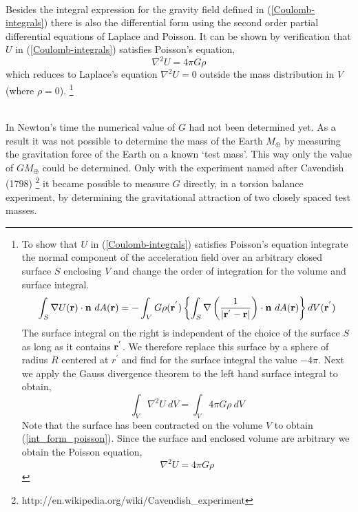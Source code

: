 ~\\
\noindent
Besides the integral expression for the gravity field defined in
(\ref{Coulomb-integrals}) there is also the differential form
using the second order partial differential equations of Laplace and
Poisson.
It can be shown by verification that $U$ in (\ref{Coulomb-integrals})
satisfies Poisson's equation, 
\begin{equation}
\boxed{\nabla^2 U = 4\pi G\rho}  \label{poisson_eqn}
\end{equation}
which reduces to Laplace's equation $\nabla^2 U = 0$
outside the mass distribution in $V$ (where $\rho =0$). 
\footnote{
To show that $U$ in (\ref{Coulomb-integrals}) satisfies Poisson's
equation integrate the normal component of the acceleration field
over an arbitrary closed surface $S$ enclosing $V$
and change the order of integration for the volume and surface
integral.
\begin{equation}
\int_S \nabla U({\bf r}) \cdot {\bf n} \ dA({\bf r})
   = - \int_V G \rho({\bf r}^{'}) 
    \left \{
     \int_S 
       \nabla 
       \left ( \frac{1}{\left | {\bf r}^{'}-{\bf r} \right |} \right )
      \cdot {\bf n} \ dA({\bf r}) 
    \right \} dV({\bf r}^{'})
\label{surface_integral}
\end{equation}
The surface integral on the right is independent of the choice of the
surface $S$ as long as it contains ${\bf r}^{'}$.
We therefore replace this surface by a sphere of radius $R$ centered
at $r^{'}$ and find for the surface integral the value $- 4 \pi$.
\newline
Next we apply the Gauss divergence theorem to the left hand surface 
integral to obtain,
\begin{equation}
\int_V \nabla^2 U \ dV = \int_V 4 \pi G \rho \ dV  
\label{int_form_poisson}
\end{equation}
Note that the surface has been contracted on the volume $V$
to obtain (\ref{int_form_poisson}).
Since the surface and enclosed volume are arbitrary we obtain the Poisson
equation,
\begin{equation}
\nabla^2 U  = 4 \pi G \rho 
\end{equation}
}

~\\
In Newton's time the numerical value of $G$ had not been
determined yet.
As a result it was not possible to determine the mass of the 
Earth $M_{\oplus}$ by measuring the gravitation force of the Earth 
on a known `test mass'.
This way only the value of $G M_{\oplus}$ could be determined.
Only with the experiment named after Cavendish (1798)
\footnote{
http://en.wikipedia.org/wiki/Cavendish\_experiment
}
it became possible
to measure $G$ directly, in a torsion balance experiment,
by determining the gravitational attraction of two closely spaced test 
masses.   

